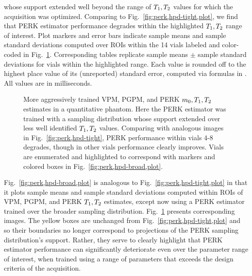 \begin{figure*}[!t]
{		whose support extended 
		well beyond the range of $T_1,T_2$ values
		for which the acquisition was optimized.
		Comparing to Fig.~\ref{fig:perk,hpd-tight,plot},
		we find that PERK estimator performance degrades 
		within the highlighted $T_1,T_2$ range of interest.
		Plot markers and error bars
		indicate sample means and sample standard deviations
		computed over ROIs
		within the 14 vials
		labeled and color-coded
		in Fig.~\ref{fig:perk,hpd-broad}.
		Corresponding tables replicate 
		sample means $\pm$ sample standard deviations
		for vials within the highlighted range.
		Each value is rounded off
		to the highest place value 
		of its (unreported) standard error,
		computed via formulas in \cite{ahn:03:seo}.
		All values are in milliseconds.
	}
	\label{fig:perk,hpd-broad,plot}
\end{figure*}

\begin{figure}[!t]
	\centering
	\begin{minipage}{\textwidth}
  	\hspace{0cm}
  	\hspace{0cm}
	\end{minipage}
	\caption{%
		More aggressively trained 
		VPM, PGPM, and PERK $m_0,T_1,T_2$ estimates
		in a quantitative phantom.
		Here the PERK estimator was trained
		with a sampling distribution
		whose support extended
		over less well identified $T_1,T_2$ values.
		Comparing with analogous images 
		in Fig.~\ref{fig:perk,hpd-tight},
		PERK performance within vials 4-8 degrades,
		though in other vials 
		performance clearly improves. 
		Vials are enumerated and highlighted
		to correspond with markers and colored boxes
		in Fig.~\ref{fig:perk,hpd-broad,plot}.
	}
	\label{fig:perk,hpd-broad}
\end{figure}

Fig.~\ref{fig:perk,hpd-broad,plot} 
is analogous to Fig.~\ref{fig:perk,hpd-tight,plot}
in that it plots sample means and sample standard deviations
computed within ROIs 
of VPM, PGPM, and PERK $T_1,T_2$ estimates,
except now using a PERK estimator trained
over the broader sampling distribution.
Fig.~\ref{fig:perk,hpd-broad} presents corresponding images. 
The yellow boxes are unchanged
from Fig.~\ref{fig:perk,hpd-tight,plot}
and so their boundaries no longer correspond
to projections of the PERK sampling distribution's support.
Rather,
they serve to clearly highlight 
that PERK estimator performance
can significantly deteriorate
even over the parameter range of interest,
when trained using a range of parameters
that exceeds the design criteria
of the acquisition.

